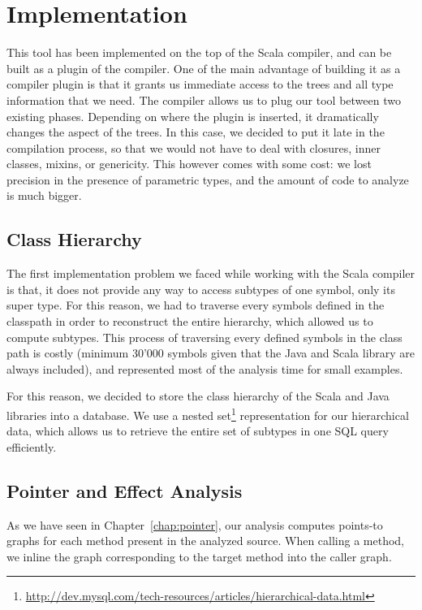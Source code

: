 \chapter{Implementation}
\label{chap:implementation}
This tool has been implemented on the top of the Scala compiler, and can be
built as a plugin of the compiler. One of the main advantage of building it as
a compiler plugin is that it grants us immediate access to the trees and all
type information that we need. The compiler allows us to plug our tool between
two existing phases. Depending on where the plugin is inserted, it dramatically
changes the aspect of the trees. In this case, we decided to put it late in the
compilation process, so that we would not have to deal with closures, inner
classes, mixins, or genericity. This however comes with some cost: we lost
precision in the presence of parametric types, and the amount of code to
analyze is much bigger.

\section{Class Hierarchy}
The first implementation problem we faced while working with the Scala compiler
is that, it does not provide any way to access subtypes of one symbol, only its
super type. For this reason, we had to traverse every symbols defined in the
classpath in order to reconstruct the entire hierarchy, which allowed us to
compute subtypes. This process of traversing every defined symbols in the class
path is costly (minimum 30'000 symbols given that the Java and Scala library are always
included), and represented most of the analysis time for small examples.

For this reason, we decided to store the class hierarchy of the Scala and Java
libraries into a database. We use a nested
set\footnote{\url{http://dev.mysql.com/tech-resources/articles/hierarchical-data.html}}
representation for our hierarchical data, which allows us to retrieve the entire
set of subtypes in one SQL query efficiently.

\section{Pointer and Effect Analysis}
As we have seen in Chapter~\ref{chap:pointer}, our analysis computes points-to
graphs for each method present in the analyzed source. When calling a method,
we inline the graph corresponding to the target method into the caller graph.

